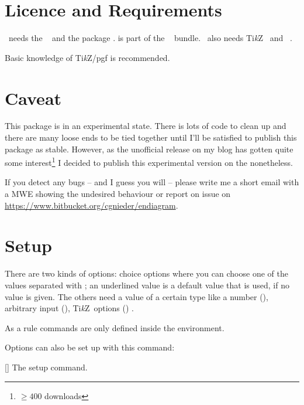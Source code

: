 \documentclass[load-preamble+]{cnltx-doc}
\newcommand*\TikZ{Ti\textit{k}Z}
\begin{document}
\section{Licence and Requirements}
\license

\ENdiagram\ needs the ~\cite{bnd:l3kernel} and the package
.  is part of the
~\cite{bnd:l3packages} bundle. \ENdiagram\ also needs
\TikZ~\cite{pkg:pgf} and ~\cite{pkg:siunitx}.

Basic knowledge of \TikZ/pgf is recommended.

\section{Caveat}
This package is in an experimental state.  There is lots of code to clean up
and there are many loose ends to be tied together until I'll be satisfied to
publish this package as stable.  However, as the unofficial release on my blog
has gotten quite some interest\footnote{$\ge 400$ downloads} I decided to
publish this experimental version on the \CTAN{} nonetheless.

If you detect any bugs -- and I guess you will -- please write me a short email
with a \ac{MWE} showing the undesired behaviour or report on issue on
\url{https://www.bitbucket.org/cgnieder/endiagram}.

\section{Setup}

There are two kinds of options: choice options where you can choose one of the
values separated with \code{|}; an underlined value is a default value that is
used, if no value is given.  The others need a value of a certain type like a
number (), arbitrary input (), \TikZ\ options
() \etc.

As a rule commands are only defined inside the  environment.

Options can also be set up with this command:
\begin{commands}
  []
    The setup command.
\end{commands}

\begin{sourcecode}
\end{sourcecode}
\end{document}
